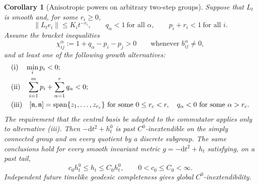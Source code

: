 \documentclass[10pt,a4paper]{article}
\numberwithin{equation}{section}
\newtheorem{corollary}[theorem]{Corollary}
\theoremstyle{definition}
\theoremstyle{remark}
\newcommand{\dd}{\mathrm d}
\begin{document}
\begin{corollary}[Anisotropic powers on arbitrary two-step groups]
\label{cor:all-two-step-anisotropic-powers}
Suppose that $L_t$ is smooth and, for some $r_i\ge0$,
\begin{equation}
 \|L_te_i\|\le K_i t^{-r_i},\qquad
 q_\alpha<1\ \text{for all }\alpha,\qquad
 p_i+r_i<1\ \text{for all }i.
 \label{eq:anisotropic-power-cone}
\end{equation}
Assume the bracket inequalities
\begin{equation}
 \chi_{ij}^{\alpha}:=1+q_\alpha-p_i-p_j>0
 \qquad\text{whenever }b_{ij}^{\alpha}\ne0,
 \label{eq:bracketwise-power-conditions}
\end{equation}
and at least one of the following growth alternatives:
\begin{equation}
\begin{aligned}
 &\text{\textup{(i)}}\quad \min_i p_i<0;\\
 &\text{\textup{(ii)}}\quad
       \sum_{i=1}^m p_i+\sum_{\alpha=1}^r q_\alpha<0;\\
 &\text{\textup{(iii)}}\quad
       [\mathfrak n,\mathfrak n]
         =\operatorname{span}\{z_1,\ldots,z_{r_c}\}
       \ \text{for some }0\le r_c<r,
       \quad q_\alpha<0\ \text{for some }\alpha>r_c.
\end{aligned}
\label{eq:anisotropic-power-growth}
\end{equation}
The requirement that the central basis be adapted to the commutator
applies only to alternative \textup{(iii)}.
Then $-\dd t^2+h_t^0$ is past $C^0$-inextendible on the simply
connected group and on every quotient by a discrete subgroup.
The same conclusions hold for every smooth invariant metric
$g=-\dd t^2+h_t$ satisfying, on a past tail,
\begin{equation}
 c_0h_t^0\le h_t\le C_0h_t^0,
 \qquad 0<c_0\le C_0<\infty.
 \label{eq:all-two-step-power-comparison}
\end{equation}
Independent future timelike geodesic completeness gives global
$C^0$-inextendibility.
\end{corollary}
\end{document}

